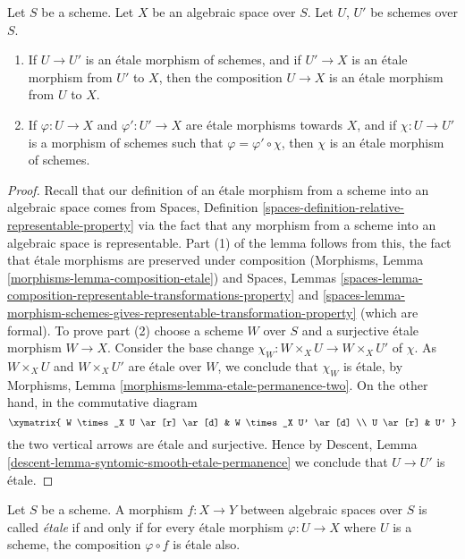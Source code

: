 \begin{lemma}
\label{lemma-etale-over-space}
Let $S$ be a scheme.
Let $X$ be an algebraic space over $S$.
Let $U$, $U'$ be schemes over $S$.
\begin{enumerate}
\item If $U \to U'$ is an \'etale morphism of schemes, and
if $U' \to X$ is an \'etale morphism from $U'$ to $X$, then the
composition $U \to X$ is an \'etale morphism from $U$ to $X$.
\item If $\varphi : U \to X$ and $\varphi' : U' \to X$ are
\'etale morphisms towards $X$, and if $\chi : U \to U'$ is a
morphism of schemes such that $\varphi = \varphi' \circ \chi$,
then $\chi$ is an \'etale morphism of schemes.
\end{enumerate}
\end{lemma}

\begin{proof}
Recall that our definition of an \'etale morphism from a scheme into an
algebraic space comes from
Spaces, Definition
\ref{spaces-definition-relative-representable-property}
via the fact that any morphism from a scheme into an algebraic space
is representable. Part (1) of the lemma follows from this, the fact that
\'etale morphisms are preserved under composition
(Morphisms, Lemma
\ref{morphisms-lemma-composition-etale})
and
Spaces, Lemmas
\ref{spaces-lemma-composition-representable-transformations-property} and
\ref{spaces-lemma-morphism-schemes-gives-representable-transformation-property}
(which are formal).
To prove part (2) choose a scheme $W$ over $S$ and a
surjective \'etale morphism $W \to X$. Consider the base change
$\chi_W : W \times_X U \to W \times_X U'$ of $\chi$.
As $W \times_X U$ and $W \times_X U'$ are \'etale over $W$, we conclude that
$\chi_W$ is \'etale, by
Morphisms, Lemma \ref{morphisms-lemma-etale-permanence-two}.
On the other hand, in the commutative diagram
$$
\xymatrix{
W \times_X U \ar[r] \ar[d] & W \times_X U' \ar[d] \\
U \ar[r] & U'
}
$$
the two vertical arrows are \'etale and surjective.
Hence by
Descent, Lemma \ref{descent-lemma-syntomic-smooth-etale-permanence}
we conclude that $U \to U'$ is \'etale.
\end{proof}

\begin{definition}
\label{definition-etale}
Let $S$ be a scheme.
A morphism $f : X \to Y$ between algebraic spaces over $S$ is
called {\it \'etale} if and only if for every \'etale morphism
$\varphi : U \to X$ where $U$ is a scheme, the composition
$\varphi \circ f$ is \'etale also.
\end{definition}

